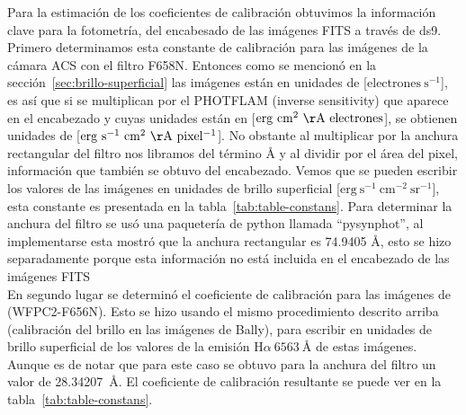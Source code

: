 \documentclass{article}
\newcommand\ha{\ensuremath{\mathrm{H}\alpha}}
\newcommand\A{\ensuremath{\text{\AA{}}}}
\begin{document}
Para la estimación de los coeficientes de calibración obtuvimos la información clave para la fotometría, del encabesado de las imágenes FITS a través de ds9. Primero determinamos esta constante de calibración para las imágenes de la cámara ACS con el filtro F658N. Entonces como se mencionó  en la sección~\ref{sec:brillo-superficial} las imágenes están en unidades de [\(\mathrm{electrones\ s^{-1}}\)], es así que si se multiplican por el PHOTFLAM (inverse sensitivity) que aparece en el encabezado y cuyas unidades están en [\(\mathrm{erg\ cm^{2}\ \AA{}\ electrones}\)], se obtienen unidades de [\(\mathrm{erg\ s^{-1}\ cm^{2}\ \AA{}\ pixel^{-1}}\)]. No obstante al multiplicar por la anchura rectangular del filtro nos libramos del término \A{} y al dividir por el área del pixel, información que también se obtuvo del encabezado. Vemos que se pueden escribir los valores de las imágenes en unidades de brillo superficial [\(\mathrm{erg~s^{-1}~cm^{-2}~ sr^{-1}}\)], esta constante es presentada en la tabla~\ref{tab:table-constans}. Para determinar la anchura del filtro se usó una paquetería de python llamada ``pysynphot'', al implementarse esta mostró que la anchura rectangular es 74.9405 \(\text{\AA{}}\), esto se hizo separadamente porque esta información no está incluida en el encabezado de las imágenes FITS\\

En segundo lugar se determinó el coeficiente de calibración  para las imágenes de \citet{Robberto:2013a} (WFPC2-F656N). Esto se hizo usando el mismo procedimiento descrito arriba (calibración del brillo en las imágenes de Bally), para escribir en unidades de brillo superficial de los valores de la emisión \(\ha{}~6563~\A{}\) de estas imágenes. Aunque es de notar que para este caso se obtuvo para la anchura del filtro un valor de 28.34207~\A{}. El coeficiente de calibración resultante se puede ver en la tabla~\ref{tab:table-constans}.\\
\end{document}
